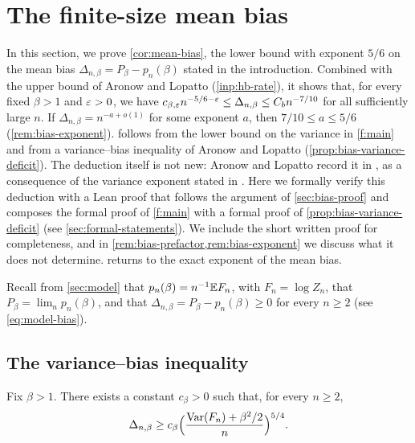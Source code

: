 \chapter{The finite-size mean bias}\label{sec:bias}

In this section, we prove \cref{cor:mean-bias}, the lower bound with exponent $5/6$ on the mean bias $\Delta_{n,\beta}=P_\beta-p_n(\beta)$ stated in the introduction. Combined with the upper bound of Aronow and Lopatto (\cref{inp:hb-rate}), it shows that, for every fixed $\beta>1$ and $\varepsilon>0$, we have $c_{\beta,\varepsilon}n^{-5/6-\varepsilon}\le\Delta_{n,\beta}\le C_b n^{-7/10}$ for all sufficiently large $n$. If $\Delta_{n,\beta}=n^{-a+o(1)}$ for some exponent $a$, then $7/10\le a\le5/6$ (\cref{rem:bias-exponent}).  follows from the lower bound on the variance in \cref{f:main} and from a variance--bias inequality of Aronow and Lopatto (\cref{prop:bias-variance-deficit}). The deduction itself is not new: Aronow and Lopatto record it in \cite[Section~1.6, p.~11]{hexagon-bias}, as a consequence of the variance exponent stated in \cite[Theorem~1.1]{oai-fluctuations}. Here we formally verify this deduction with a Lean proof that follows the argument of \cref{sec:bias-proof} and composes the formal proof of \cref{f:main} with a formal proof of \cref{prop:bias-variance-deficit} (see \cref{sec:formal-statements}). We include the short written proof for completeness, and in \cref{rem:bias-prefactor,rem:bias-exponent} we discuss what it does not determine.  returns to the exact exponent of the mean bias.

Recall from \cref{sec:model} that $p_n(\beta)=n^{-1}\mathbb E F_n$, with $F_n=\log Z_n$, that $P_\beta=\lim_np_n(\beta)$, and that $\Delta_{n,\beta}=P_\beta-p_n(\beta)\ge0$ for every $n\ge2$ (see \eqref{eq:model-bias}).

\section{The variance--bias inequality}\label{sec:bias-inequality}

\begin{proposition}\label{prop:bias-variance-deficit}
Fix $\beta>1$. There exists a constant $c_\beta>0$ such that, for every $n\ge2$,
\begin{equation}\label{eq:mean-bias-variance-deficit}
 \Delta_{n,\beta}\ge c_\beta\Bigl(\frac{\operatorname{Var}(F_n)+\beta^2/2}{n}\Bigr)^{5/4}.
\end{equation}
\end{proposition}

